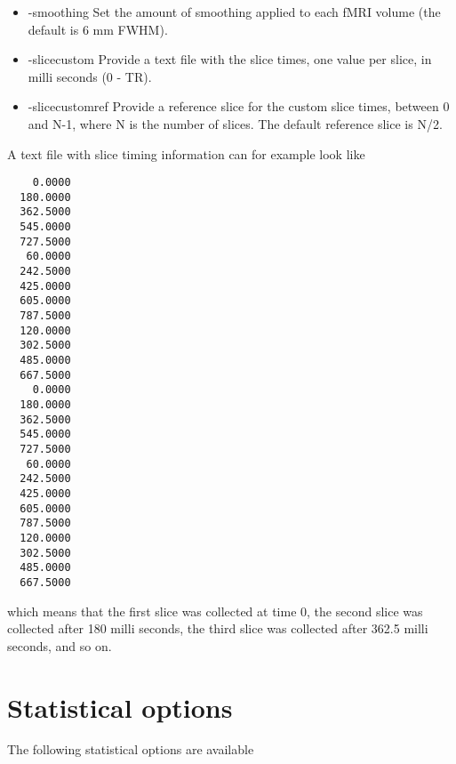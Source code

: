 \begin{itemize}
\item -smoothing 
\newline \newline Set the amount of smoothing applied to \newline each fMRI volume (the default is 6 mm FWHM). 

\item -slicecustom
\newline \newline Provide a text file with the slice times, \newline
				  one value per slice, in milli seconds (0 - TR). \newline

\item -slicecustomref
\newline \newline Provide a reference slice for the custom slice times, \newline
				  between 0 and N-1, where N is the number of slices. \newline
				  The default reference slice is N/2.
 
\end{itemize}

A text file with slice timing information can for example look like
\begin{verbatim}
    0.0000
  180.0000
  362.5000
  545.0000
  727.5000
   60.0000
  242.5000
  425.0000
  605.0000
  787.5000
  120.0000
  302.5000
  485.0000
  667.5000
    0.0000
  180.0000
  362.5000
  545.0000
  727.5000
   60.0000
  242.5000
  425.0000
  605.0000
  787.5000
  120.0000
  302.5000
  485.0000
  667.5000
\end{verbatim}
which means that the first slice was collected at time 0, the second slice was collected after 180 milli seconds, the third slice was collected after 362.5 milli seconds, and so on.


\section{Statistical options}

The following statistical options are available

